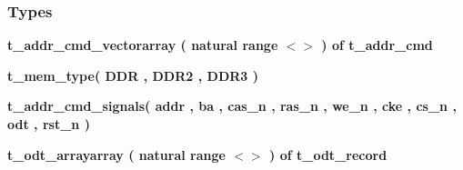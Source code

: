 \subsubsection*{Types}
 \begin{DoxyCompactItemize}
\item 
{\bfseries {\bf t\+\_\+addr\+\_\+cmd\+\_\+vector}{\bfseries \textcolor{keywordflow}{array}\textcolor{vhdlchar}{ }\textcolor{vhdlchar}{(}\textcolor{vhdlchar}{ }\textcolor{comment}{natural}\textcolor{vhdlchar}{ }\textcolor{keywordflow}{range}\textcolor{vhdlchar}{ }\textcolor{vhdlchar}{$<$$>$}\textcolor{vhdlchar}{ }\textcolor{vhdlchar}{)}\textcolor{vhdlchar}{ }\textcolor{vhdlchar}{ }\textcolor{keywordflow}{of}\textcolor{vhdlchar}{ }{\bfseries {\bf t\+\_\+addr\+\_\+cmd}} \textcolor{vhdlchar}{ }}} 
\item 
{\bfseries {\bf t\+\_\+mem\+\_\+type}{\bfseries \textcolor{vhdlchar}{(}\textcolor{vhdlchar}{ }\textcolor{vhdlchar}{D\+DR}\textcolor{vhdlchar}{ }\textcolor{vhdlchar}{,}\textcolor{vhdlchar}{ }\textcolor{vhdlchar}{D\+D\+R2}\textcolor{vhdlchar}{ }\textcolor{vhdlchar}{,}\textcolor{vhdlchar}{ }\textcolor{vhdlchar}{D\+D\+R3}\textcolor{vhdlchar}{ }\textcolor{vhdlchar}{)}\textcolor{vhdlchar}{ }}} 
\item 
{\bfseries {\bf t\+\_\+addr\+\_\+cmd\+\_\+signals}{\bfseries \textcolor{vhdlchar}{(}\textcolor{vhdlchar}{ }{\bfseries {\bf addr}} \textcolor{vhdlchar}{ }\textcolor{vhdlchar}{,}\textcolor{vhdlchar}{ }{\bfseries {\bf ba}} \textcolor{vhdlchar}{ }\textcolor{vhdlchar}{,}\textcolor{vhdlchar}{ }{\bfseries {\bf cas\+\_\+n}} \textcolor{vhdlchar}{ }\textcolor{vhdlchar}{,}\textcolor{vhdlchar}{ }{\bfseries {\bf ras\+\_\+n}} \textcolor{vhdlchar}{ }\textcolor{vhdlchar}{,}\textcolor{vhdlchar}{ }{\bfseries {\bf we\+\_\+n}} \textcolor{vhdlchar}{ }\textcolor{vhdlchar}{,}\textcolor{vhdlchar}{ }{\bfseries {\bf cke}} \textcolor{vhdlchar}{ }\textcolor{vhdlchar}{,}\textcolor{vhdlchar}{ }{\bfseries {\bf cs\+\_\+n}} \textcolor{vhdlchar}{ }\textcolor{vhdlchar}{,}\textcolor{vhdlchar}{ }{\bfseries {\bf odt}} \textcolor{vhdlchar}{ }\textcolor{vhdlchar}{,}\textcolor{vhdlchar}{ }{\bfseries {\bf rst\+\_\+n}} \textcolor{vhdlchar}{ }\textcolor{vhdlchar}{)}\textcolor{vhdlchar}{ }}} 
\item 
{\bfseries {\bf t\+\_\+odt\+\_\+array}{\bfseries \textcolor{keywordflow}{array}\textcolor{vhdlchar}{ }\textcolor{vhdlchar}{(}\textcolor{vhdlchar}{ }\textcolor{comment}{natural}\textcolor{vhdlchar}{ }\textcolor{keywordflow}{range}\textcolor{vhdlchar}{ }\textcolor{vhdlchar}{$<$$>$}\textcolor{vhdlchar}{ }\textcolor{vhdlchar}{)}\textcolor{vhdlchar}{ }\textcolor{vhdlchar}{ }\textcolor{keywordflow}{of}\textcolor{vhdlchar}{ }{\bfseries {\bf t\+\_\+odt\+\_\+record}} \textcolor{vhdlchar}{ }}} 
\end{DoxyCompactItemize}
